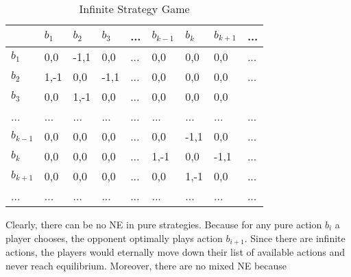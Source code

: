 \documentclass[10pt,a4paper]{article}
\begin{document}
\begin{table}[h]
\centering
\caption{Infinite Strategy Game}
\begin{tabular}{|l|l|l|l|l|l|l|l|l|}
\hline
          & $b_1$ & $b_2$ & $b_3$ & ... & $b_{k-1}$ & $b_{k}$ & $b_{k+1}$ & ... \\ \hline
$b_1$     & 0,0   & -1,1  & 0,0   & ... & 0,0       & 0,0     & 0,0       & ... \\ \hline
$b_2$     & 1,-1  & 0,0   & -1,1  & ... & 0,0       & 0,0     & 0,0       & ... \\ \hline
$b_3$     & 0,0   & 1,-1  & 0,0   & ... & 0,0       & 0,0     & 0,0       &     \\ \hline
...       & ...   & ...   & ...   & ... & ...       & ...     & ...       & ... \\ \hline
$b_{k-1}$ & 0,0   & 0,0   & 0,0   & ... & 0,0       & -1,1    & 0,0       & ... \\ \hline
$b_{k}$   & 0,0   & 0,0   & 0,0   & ... & 1,-1      & 0,0     & -1,1      & ... \\ \hline
$b_{k+1}$ & 0,0   & 0,0   & 0,0   & ... & 0,0       & 1,-1    & 0,0       & ... \\ \hline
...       & ...   & ...   & ...   & ... & ...       & ...     & ...       & ... \\ \hline
\end{tabular}
\end{table}

Clearly, there can be no NE in pure strategies. Because for any pure action $b_i$ a player chooses, the opponent optimally plays action $b_{i+1}$. Since there are infinite actions, the players would eternally move down their list of available actions and never reach equilibrium. Moreover, there are no mixed NE because
\end{document}
